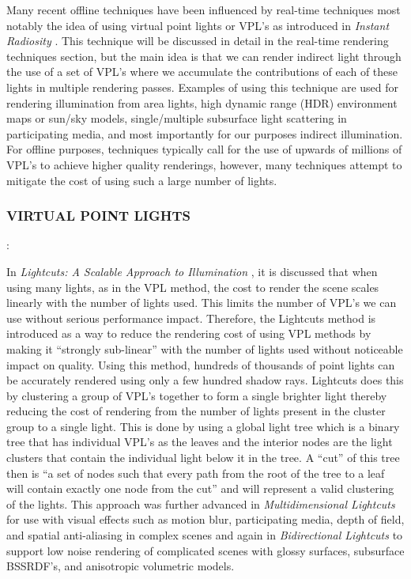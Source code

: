 Many recent offline techniques have been influenced by real-time techniques most notably the idea of using virtual point lights or VPL's as introduced in \textit{Instant Radiosity} \cite{Keller1997}.  This technique will be discussed in detail in the real-time rendering techniques section, but the main idea is that we can render indirect light through the use of a set of VPL's where we accumulate the contributions of each of these lights in multiple rendering passes.  Examples of using this technique are used for rendering illumination from area lights, high dynamic range (HDR) environment maps or sun/sky models, single/multiple subsurface light scattering in participating media, and most importantly for our purposes indirect illumination.  For offline purposes, techniques typically call for the use of upwards of millions of VPL's to achieve higher quality renderings, however, many techniques attempt to mitigate the cost of using such a large number of lights.

\subsubsection{VIRTUAL POINT LIGHTS}: 

In \textit{Lightcuts: A Scalable Approach to Illumination} \cite{Walter2005}, it is discussed that when using many lights, as in the VPL method, the cost to render the scene scales linearly with the number of lights used.  This limits the number of VPL's we can use without serious performance impact.  Therefore, the Lightcuts method is introduced as a way to reduce the rendering cost of using VPL methods by making it “strongly sub-linear” with the number of lights used without noticeable impact on quality.  Using this method, hundreds of thousands of point lights can be accurately rendered using only a few hundred shadow rays.  Lightcuts does this by clustering a group of VPL's together to form a single brighter light thereby reducing the cost of rendering from the number of lights present in the cluster group to a single light.  This is done by using a global light tree which is a binary tree that has individual VPL's as the leaves and the interior nodes are the light clusters that contain the individual light below it in the tree.  A “cut” of this tree then is “a set of nodes such that every path from the root of the tree to a leaf will contain exactly one node from the cut” and will represent a valid clustering of the lights.  This approach was further advanced in \textit{Multidimensional Lightcuts} \cite{Walter2006} for use with visual effects such as motion blur, participating media, depth of field, and spatial anti-aliasing in complex scenes and again in \textit{Bidirectional Lightcuts} \cite{Walter2012} to support low noise rendering of complicated scenes with glossy surfaces, subsurface BSSRDF's, and anisotropic volumetric models.


